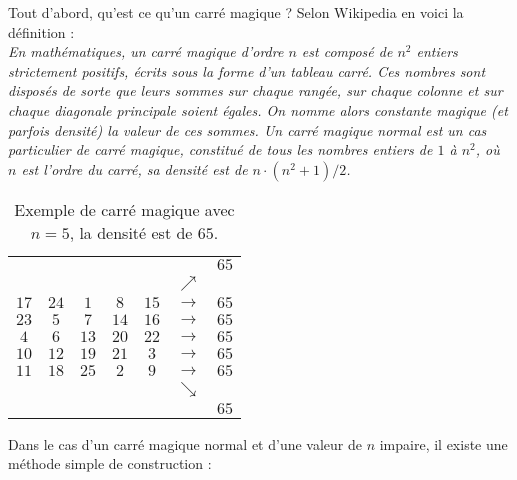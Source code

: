 
Tout d'abord, qu'est ce qu'un carré magique ? Selon Wikipedia en voici la définition :\\

\textsl{\og En mathématiques, un carré magique d'ordre $n$ est composé de $n^2$ entiers strictement positifs, écrits sous la forme d'un tableau carré. Ces nombres sont disposés de sorte que leurs sommes sur chaque rangée, sur chaque colonne et sur chaque diagonale principale soient égales. On nomme alors constante magique (et parfois densité) la valeur de ces sommes. Un carré magique normal est un cas particulier de carré magique, constitué de tous les nombres entiers de $1$ à $n^2$, où $n$ est l'ordre du carré, sa densité est de $n\cdot(n^2+1)/2$.\fg}\\
\renewcommand{\arraystretch}{1.5}
\begin{table}[htbp]
	\centering
		\begin{tabular}{|*{5}{c|}cc}
			\multicolumn{6}{r}{}                &$65$\\
		  \multicolumn{6}{r}{$\nearrow$}      &   \\
			\cline{1-5}
			$17$&$24$&$1$&$8$&$15$&$\rightarrow$&$65$\\
			\cline{1-5}
			$23$&$5$&$7$&$14$&$16$&$\rightarrow$&$65$\\
			\cline{1-5}
			$4$&$6$&$13$&$20$&$22$&$\rightarrow$&$65$\\
			\cline{1-5}
			$10$&$12$&$19$&$21$&$3$&$\rightarrow$&$65$\\
			\cline{1-5}
			$11$&$18$&$25$&$2$&$9$&$\rightarrow$&$65$\\
			\cline{1-5}
			\multicolumn{6}{r}{$\searrow$}      &   \\
			\multicolumn{6}{r}{}                &$65$\\
		  
		\end{tabular}
		\caption{Exemple de carré magique avec $n=5$, la densité est de $65$.}
\end{table}
\renewcommand{\arraystretch}{1}

\newpage

Dans le cas d'un carré magique normal et d'une valeur de $n$ impaire, il existe une méthode simple de construction :

